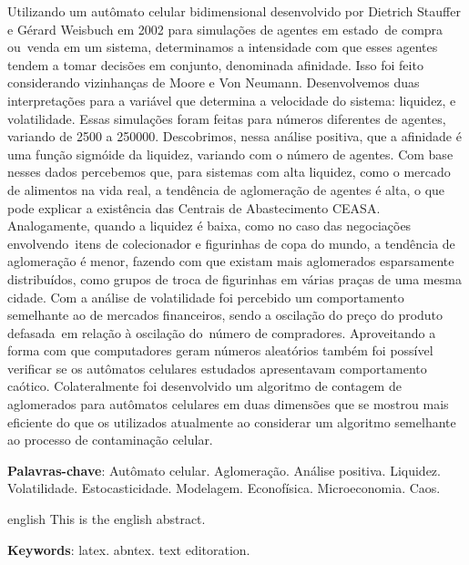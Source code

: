 \documentclass[
	12pt,				%
	openright,			%
	twoside,			%
	a4paper,			%
	english,			%
	french,				%
	spanish,			%
	brazil				%
	]{abntex2}
\begin{document}
\setlength{\absparsep}{18pt} %
\begin{resumo}
  Utilizando um autômato celular bidimensional desenvolvido por Dietrich Stauffer e Gérard Weisbuch em 2002 para simulações de agentes em estado de compra ou venda em um sistema, determinamos a intensidade com que esses agentes tendem a tomar decisões em conjunto, denominada afinidade. Isso foi feito considerando vizinhanças de Moore e Von Neumann. Desenvolvemos duas interpretações para a variável que determina a velocidade do sistema: liquidez, e volatilidade. Essas simulações foram feitas para números diferentes de agentes, variando de 2500 a 250000. Descobrimos, nessa análise positiva, que a afinidade é uma função sigmóide da liquidez, variando com o número de agentes. Com base nesses dados percebemos que, para sistemas com alta liquidez, como o mercado de alimentos na vida real, a tendência de aglomeração de agentes é alta, o que pode explicar a existência das Centrais de Abastecimento CEASA. Analogamente, quando a liquidez é baixa, como no caso das negociações envolvendo itens de colecionador e figurinhas de copa do mundo, a tendência de aglomeração é menor, fazendo com que existam mais aglomerados esparsamente distribuídos, como grupos de troca de figurinhas em várias praças de uma mesma cidade. Com a análise de volatilidade foi percebido um comportamento semelhante ao de mercados financeiros, sendo a oscilação do preço do produto defasada em relação à oscilação do número de compradores. Aproveitando a forma com que computadores geram números aleatórios também foi possível verificar se os autômatos celulares estudados apresentavam comportamento caótico. Colateralmente foi desenvolvido um algoritmo de contagem de aglomerados para autômatos celulares em duas dimensões que se mostrou mais eficiente do que os utilizados atualmente ao considerar um algoritmo semelhante ao processo de contaminação celular.

 \textbf{Palavras-chave}: Autômato celular. Aglomeração. Análise positiva. Liquidez. Volatilidade. Estocasticidade. Modelagem. Econofísica. Microeconomia. Caos.
\end{resumo}

\begin{resumo}[Abstract]
 \begin{otherlanguage*}{english}
   This is the english abstract.

   \vspace{\onelineskip}
 
   \noindent 
   \textbf{Keywords}: latex. abntex. text editoration.
 \end{otherlanguage*}
\end{resumo}
\end{document}
